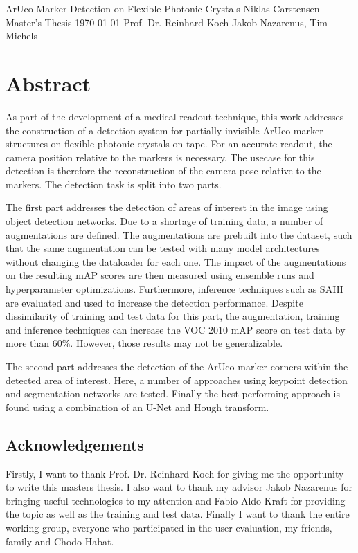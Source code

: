 \documentclass[10pt]{book}
\newcommand*\NewPage{\newpage\null\thispagestyle{empty}\newpage}
\begin{document}
\frontmatter

\studtitlepage%
{ArUco Marker Detection on Flexible Photonic Crystals}%
{}
{Niklas Carstensen}%
{Master's Thesis}%
{\today}%
{Prof. Dr. Reinhard Koch}%
{Jakob Nazarenus, Tim Michels}%
\NewPage{}
\setcounter{page}{2}
\studeidesstatt
\NewPage{}

\setcounter{page}{3}
\chapter*{Abstract}

As part of the development of a medical readout technique, this work addresses the construction of a detection system for partially invisible \ac{ArUco} marker structures on flexible photonic crystals on tape. For an accurate readout, the camera position relative to the markers is necessary. The usecase for this detection is therefore the reconstruction of the camera pose relative to the markers. The detection task is split into two parts. 

The first part addresses the detection of areas of interest in the image using object detection networks. Due to a shortage of training data, a number of augmentations are defined. The augmentations are prebuilt into the dataset, such that the same augmentation can be tested with many model architectures without changing the dataloader for each one. The impact of the augmentations on the resulting \ac{mAP} scores are then measured using ensemble runs and hyperparameter optimizations. Furthermore, inference techniques such as \ac{SAHI} are evaluated and used to increase the detection performance. Despite dissimilarity of training and test data for this part, the augmentation, training and inference techniques can increase the VOC 2010 \ac{mAP} score on test data by more than 60\%. However, those results may not be generalizable.

The second part addresses the detection of the \ac{ArUco} marker corners within the detected area of interest. Here, a number of approaches using keypoint detection and segmentation networks are tested. Finally the best performing approach is found using a combination of an U-Net and Hough transform.

\newpage
\section*{Acknowledgements}
Firstly, I want to thank Prof. Dr. Reinhard Koch for giving me the opportunity to write this masters thesis. I also want to thank my advisor Jakob Nazarenus for bringing useful technologies to my attention and Fabio Aldo Kraft for providing the topic as well as the training and test data. Finally I want to thank the entire working group, everyone who participated in the user evaluation, my friends, family and Chodo Habat.
\end{document}
